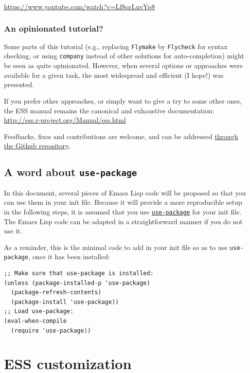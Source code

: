 \documentclass[11pt]{article}
\begin{document}
\begin{center}
\url{https://www.youtube.com/watch?v=Lf8qrLuvYp8}
\end{center}


\subsubsection{An opinionated tutorial?}
\label{sec:orgaedb8ab}
Some parts of this tutorial (e.g., replacing \texttt{Flymake} by \texttt{Flycheck} for syntax checking, or using \texttt{company} instead of other solutions for auto-completion) might be seen as quite opinionated. However, when several options or approaches were available for a given task, the most widespread and efficient (I hope!) was presented.

If you prefer other approaches, or simply want to give a try to some other ones, the ESS manual remains the canonical and exhaustive documentation: \url{http://ess.r-project.org/Manual/ess.html}

Feedbacks, fixes and contributions are welcome, and can be addressed \href{https://github.com/ess-intro/presentation-ess-customization/issues}{through the Github repository}.

\subsection{A word about \texttt{use-package}}
\label{sec:org1e31867}
In this document, several pieces of Emacs Lisp code will be proposed so that you can use them in your init file. Because it will provide a more reproducible setup in the following steps, it is assumed that you use \href{https://jwiegley.github.io/use-package/}{\texttt{use-package}} for your init file. The Emacs Lisp code can be adapted in a straightforward manner if you do not use it.

As a reminder, this is the minimal code to add in your init file so as to use \texttt{use-package}, once it has been installed:

\begin{verbatim}
;; Make sure that use-package is installed:
(unless (package-installed-p 'use-package)
  (package-refresh-contents)
  (package-install 'use-package))
;; Load use-package:
(eval-when-compile
  (require 'use-package))
\end{verbatim}

\section{ESS customization}
\label{sec:org5c6aa43}
\end{document}
